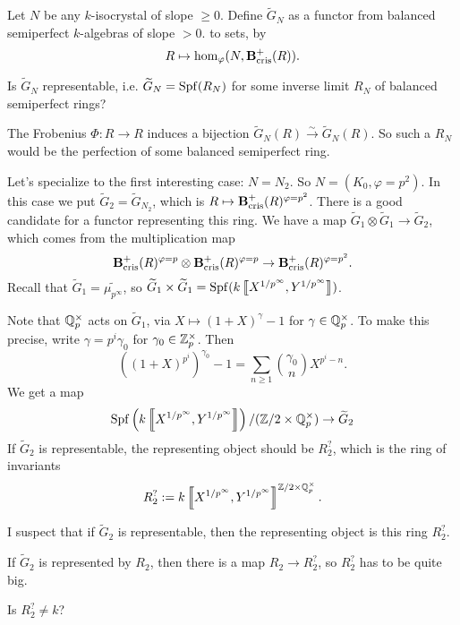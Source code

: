 \begin{definition}
Let $N$ be any $k$-isocrystal of slope $\geqslant 0$. Define 
$\widetilde G_N$ as a functor from balanced semiperfect $k$-algebras of slope 
$>0$. to sets, by 
\[
  R\mapsto \hom_\varphi(N,\mathbf{B}_\textnormal{cris}^+(R)) .
\]
\end{definition}

\begin{question}
Is $\widetilde G_N$ representable, i.e. $\widetilde G_N=\operatorname{Spf}(R_N)$ for some 
inverse limit $R_N$ of balanced semiperfect rings?
\end{question}

The Frobenius $\Phi:R\to R$ induces a bijection $\widetilde G_N(R) \xrightarrow\sim \widetilde G_N(R)$. 
So such a $R_N$ would be the perfection of some balanced semiperfect ring. 

Let's specialize to the first interesting case: $N=N_2$. So 
$N=(K_0,\varphi=p^2)$. In this case we put 
$\widetilde G_2 = \widetilde G_{N_2}$, which is 
$R\mapsto \mathbf{B}_\textnormal{cris}^+(R)^{\varphi=p^2}$. There is a good candidate for a functor 
representing this ring. We have a map 
$\widetilde G_1\otimes \widetilde G_1 \to \widetilde G_2$, which comes from 
the multiplication map 
\[
  \mathbf{B}_\textnormal{cris}^+(R)^{\varphi=p}\otimes \mathbf{B}_\textnormal{cris}^+(R)^{\varphi=p} \to \mathbf{B}_\textnormal{cris}^+(R)^{\varphi=p^2} .
\]
Recall that $\widetilde G_1=\widetilde{\mu_{p^\infty}}$, so 
$\widetilde G_1\times \widetilde G_1=\operatorname{Spf}(k\left\llbracket {X^{1/p^\infty},Y^{1/p^\infty}} \right\rrbracket)$. 

Note that $\mathbb{Q}_p^\times$ acts on $\widetilde G_1$, via 
$X\mapsto (1+X)^\gamma-1$ for $\gamma\in \mathbb{Q}_p^\times$. To make this precise, 
write $\gamma=p^i\gamma_0$ for $\gamma_0\in \mathbb{Z}_p^\times$. Then 
\[
  ((1+X)^{p^i})^{\gamma_0}-1 = \sum_{n\geqslant 1} \binom{\gamma_0}{n} X^{p^i-n} .
\]
We get a map 
\[
  \operatorname{Spf}\left(k\left\llbracket {X^{1/p^\infty},Y^{1/p^\infty}} \right\rrbracket\right) / (\mathbb{Z}/2 \times \mathbb{Q}_p^\times) \to \widetilde G_2 
\]
If $\widetilde G_2$ is representable, the representing object should be 
$R_2^?$, which is the ring of invariants 
\[
  R_2^? := k\left\llbracket {X^{1/p^\infty},Y^{1/p^\infty}} \right\rrbracket^{\mathbb{Z}/2 \times \mathbb{Q}_p^\times} .
\]

I suspect that if $\widetilde G_2$ is representable, then the representing object is 
this ring $R_2^?$. 

If $\widetilde G_2$ is represented by $R_2$, then there is a map 
$R_2\to R_2^?$, so $R_2^?$ has to be quite big. 

\begin{question}
Is $R_2^?\ne k$?
\end{question}

